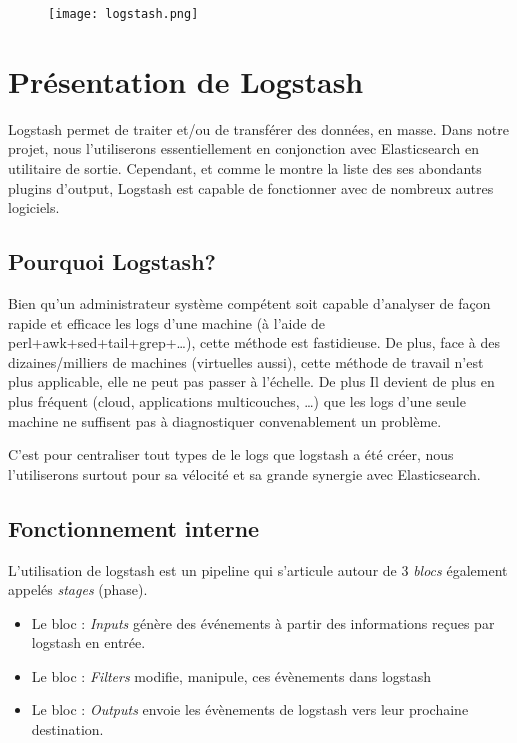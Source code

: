 \begin{figure}[H]
\center
\texttt{[image: logstash.png]}
\label{fig:logstashlogo.png}
\end{figure}
\section{Présentation de Logstash}

Logstash permet de traiter et/ou de transférer des données, en masse. Dans notre 
projet, nous l'utiliserons essentiellement en conjonction avec Elasticsearch en 
utilitaire de sortie. Cependant,
et comme le montre la liste des ses abondants plugins d'output, Logstash est capable
de fonctionner avec de nombreux autres logiciels.

\subsection{Pourquoi Logstash?}
Bien qu'un administrateur système compétent soit capable d'analyser de façon rapide 
et efficace les logs d'une machine (à l'aide de perl+awk+sed+tail+grep+\ldots), cette méthode
est fastidieuse. De plus, face à des dizaines/milliers de machines (virtuelles aussi), 
cette méthode de travail n'est plus applicable, elle ne peut pas passer à l'échelle.
De plus Il devient de plus en plus fréquent (cloud, applications multicouches, \ldots) 
que les logs d'une seule machine ne suffisent pas à diagnostiquer convenablement un 
problème.

C'est pour centraliser tout types de le \gls{logs} que logstash a été créer, nous
l'utiliserons surtout pour sa vélocité et sa grande synergie avec Elasticsearch.

\subsection{Fonctionnement interne}
L'utilisation de logstash est un pipeline qui s'articule autour de 3 \emph{blocs} 
également appelés \emph{stages} (phase).
\begin{itemize}
    \item   Le bloc : \emph{Inputs} génère des événements à partir des informations reçues
    par logstash en entrée.
    \item   Le bloc : \emph{Filters} modifie, manipule, ces évènements dans logstash
    \item   Le bloc : \emph{Outputs} envoie les évènements de logstash vers leur 
    prochaine destination.
\end{itemize}

